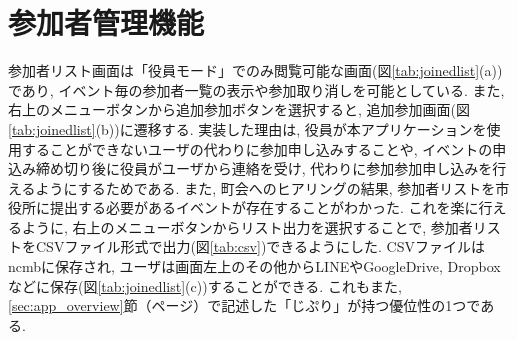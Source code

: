 \section{参加者管理機能}%
参加者リスト画面は「役員モード」でのみ閲覧可能な画面(図\ref{tab:joinedlist}(a))であり, イベント毎の参加者一覧の表示や参加取り消しを可能としている. また, 右上のメニューボタンから追加参加ボタンを選択すると, 追加参加画面(図\ref{tab:joinedlist}(b))に遷移する. 実装した理由は, 役員が本アプリケーションを使用することができないユーザの代わりに参加申し込みすることや, イベントの申込み締め切り後に役員がユーザから連絡を受け, 代わりに参加参加申し込みを行えるようにするためである. また, 町会へのヒアリングの結果, 参加者リストを市役所に提出する必要があるイベントが存在することがわかった. これを楽に行えるように, 右上のメニューボタンからリスト出力を選択することで, 参加者リストをCSVファイル形式で出力(図\ref{tab:csv})できるようにした. CSVファイルはncmbに保存され, ユーザは画面左上のその他からLINEやGoogleDrive, Dropboxなどに保存(図\ref{tab:joinedlist}(c))することができる. これもまた, \ref{sec:app_overview}節（\pageref{sec:app_overview}ページ）で記述した「じぷり」が持つ優位性の1つである.
\clearpage

